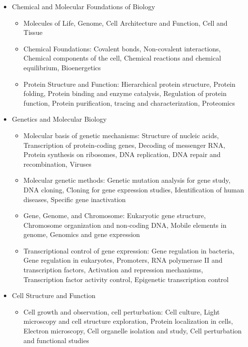 \documentclass[12pt]{article}
\begin{document}
\begin{itemize}
    \item Chemical and Molecular Foundations of Biology
    \begin{itemize}
        \item Molecules of Life, Genome, Cell Architecture and Function, Cell and Tissue
        \item Chemical Foundations: Covalent bonds, Non-covalent interactions, Chemical components of the cell, Chemical reactions and chemical equilibrium, Bioenergetics
        \item Protein Structure and Function: Hierarchical protein structure, Protein folding, Protein binding and enzyme catalysis, Regulation of protein function, Protein purification, tracing and characterization, Proteomics
    \end{itemize}
    
    \item Genetics and Molecular Biology
    \begin{itemize}
        \item Molecular basis of genetic mechanisms: Structure of nucleic acids, Transcription of protein-coding genes, Decoding of messenger RNA, Protein synthesis on ribosomes, DNA replication, DNA repair and recombination, Viruses
        \item Molecular genetic methods: Genetic mutation analysis for gene study, DNA cloning, Cloning for gene expression studies, Identification of human diseases, Specific gene inactivation
        \item Gene, Genome, and Chromosome: Eukaryotic gene structure, Chromosome organization and non-coding DNA, Mobile elements in genome, Genomics and gene expression
        \item Transcriptional control of gene expression: Gene regulation in bacteria, Gene regulation in eukaryotes, Promoters, RNA polymerase II and transcription factors, Activation and repression mechanisms, Transcription factor activity control, Epigenetic transcription control
    \end{itemize}

    \item Cell Structure and Function
    \begin{itemize}
        \item Cell growth and observation, cell perturbation: Cell culture, Light microscopy and cell structure exploration, Protein localization in cells, Electron microscopy, Cell organelle isolation and study, Cell perturbation and functional studies
    \end{itemize}
\end{itemize}
\end{document}
